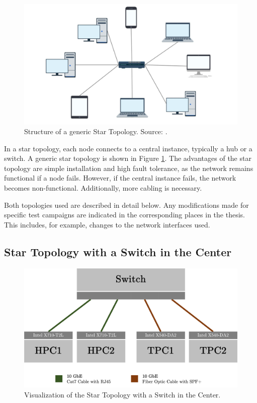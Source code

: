 \begin{figure}[h]
    \centering
    \includegraphics[width=0.6\linewidth]{figures/method/topo1.png}
    \caption[Structure of a generic Star Topology]{Structure of a generic Star Topology. Source: \cite{topo01}.}
    \label{fig:startopoGeneral}
\end{figure}

In a star topology, each node connects to a central instance, typically a hub or a switch. A generic star topology is shown in Figure \ref{fig:startopoGeneral}. The advantages of the star topology are simple installation and high fault tolerance, as the network remains functional if a node fails. However, if the central instance fails, the network becomes non-functional. Additionally, more cabling is necessary.

Both topologies used are described in detail below. Any modifications made for specific test campaigns are indicated in the corresponding places in the thesis. This includes, for example, changes to the network interfaces used.

\subsection{Star Topology with a Switch in the Center} \label{chap:TopoSwitch}

\begin{figure}[h]
    \centering
    \includegraphics[width=1\linewidth]{figures/method/topo2.png}
    \caption[Visualization of the Star Topology with a Switch in the Center]{Visualization of the Star Topology with a Switch in the Center.}
    \label{fig:startopoSwitch}
\end{figure}

